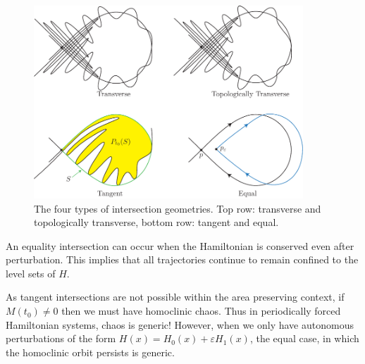 \begin{figure}[h!]
	\centering
	\includegraphics[width=0.9\textwidth]{figures/ch8/10intersection_geometry.pdf}
	\caption{The four types of intersection geometries. Top row: transverse and topologically transverse, bottom row: tangent and equal.}
	\label{fig:intersection_types}
\end{figure}

An equality intersection can occur when the Hamiltonian is conserved even after perturbation. This implies that all trajectories continue to remain confined to the level sets of $H$. 

As tangent intersections are not possible within the area preserving context, if $M(t_0) \neq 0$ then we must have homoclinic chaos. Thus in periodically forced Hamiltonian systems, chaos is generic! However, when we only have autonomous perturbations of the form $H(x)=H_0(x)+\varepsilon H_1(x)$, the equal case, in which the homoclinic orbit persists is generic. 

